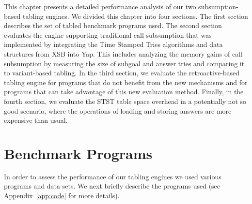 This chapter presents a detailed performance analysis of our two subsumption-based tabling engines.
We divided this chapter into four sections. The first section describes the
set of tabled benchmark programs used. The second
section evaluates the engine supporting traditional call subsumption that was implemented by integrating the
Time Stamped Tries algorithms and data structures from XSB into Yap. This includes analyzing the memory gains
of call subsumption by measuring the size of subgoal and answer tries and comparing it to variant-based tabling.
In the third section, we evaluate the retroactive-based tabling engine for programs that do not benefit
from the new mechanisms and for programs that can take advantage of this new evaluation method. Finally,
in the fourth section, we evaluate the STST table space overhead in a potentially not so good scenario,
where the operations of loading and storing answers are more expensive than usual.

\section{Benchmark Programs}

In order to assess the performance of our tabling engines we used various programs and data sets.
We next briefly describe the programs used (see Appendix~\ref{app:code} for more details).

